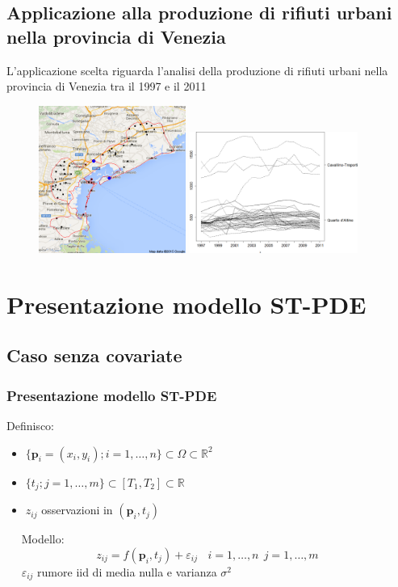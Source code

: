 \documentclass[landscape,9pt]{beamer}                           %
\begin{document}
\subsection{Applicazione alla produzione di rifiuti urbani nella provincia di Venezia}
\begin{frame}
L'applicazione scelta riguarda l'analisi della produzione di rifiuti urbani nella provincia di Venezia tra il 1997 e il 2011
\begin{figure}[h]
	\centering
	\subfigure
   {
	\includegraphics[width=0.43\textwidth]{Immagini/CTQDA.png}   
   }
	\subfigure
   {
	\includegraphics[width=0.49\textwidth]{Immagini/andamenti_temporali.png}
   }
\end{figure}
\end{frame}



\section{Presentazione modello ST-PDE}
\subsection{Caso senza covariate}
\begin{frame}
\frametitle{Presentazione modello ST-PDE}
Definisco:
\begin{itemize}
\item $\{\bm{p}_i = (x_i,y_i); i=1, \ldots , n\} \subset \Omega \subset \mathbb{R}^2$
\item $\{t_j ; j=1, \ldots , m\} \subset [T_1,T_2]\subset \mathbb{R}$
\item $z_{ij}$ osservazioni in $(\bm{p}_i,t_j)$
\end{itemize}
\ \ 
\newline
Modello:
$$
z_{ij}=f(\bm{p}_i,t_j)+\varepsilon_{ij}\ \ \ \ i = 1,\ldots,n\ \ j=1,\ldots,m \ \ 
$$
\ \ 
\newline
$\varepsilon_{ij}$ rumore iid di media nulla e varianza $\sigma^2$
\end{frame}
\end{document}
